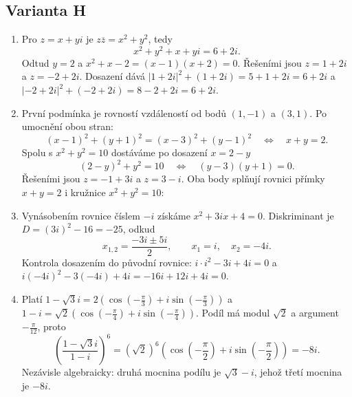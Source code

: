 \documentclass[a4paper,10pt]{article}
\begin{document}
\subsection*{Varianta H}
\begin{enumerate}
\item Pro $z=x+yi$ je $z\overline z=x^2+y^2$, tedy
\[
x^2+y^2+x+yi=6+2i.
\]
Odtud $y=2$ a $x^2+x-2=(x-1)(x+2)=0$.
Řešeními jsou $z=1+2i$ a $z=-2+2i$.
Dosazení dává $|1+2i|^2+(1+2i)=5+1+2i=6+2i$ a
$|-2+2i|^2+(-2+2i)=8-2+2i=6+2i$.

\item První podmínka je rovností vzdáleností od bodů $(1,-1)$
a $(3,1)$. Po umocnění obou stran:
\[
(x-1)^2+(y+1)^2=(x-3)^2+(y-1)^2
\quad\Longleftrightarrow\quad x+y=2.
\]
Spolu s $x^2+y^2=10$ dostáváme po dosazení $x=2-y$
\[
(2-y)^2+y^2=10
\quad\Longleftrightarrow\quad (y-3)(y+1)=0.
\]
Řešeními jsou $z=-1+3i$ a $z=3-i$. Oba body splňují
rovnici přímky $x+y=2$ i kružnice $x^2+y^2=10$:
\begin{center}
\end{center}

\item Vynásobením rovnice číslem $-i$ získáme
$x^2+3ix+4=0$. Diskriminant je $D=(3i)^2-16=-25$,
odkud
\[
x_{1,2}=\frac{-3i\pm5i}{2},
\qquad x_1=i,\quad x_2=-4i.
\]
Kontrola dosazením do původní rovnice:
$i\cdot i^2-3i+4i=0$ a
$i(-4i)^2-3(-4i)+4i=-16i+12i+4i=0$.

\item Platí $1-\sqrt3i=2(\cos(-\frac\pi3)+i\sin(-\frac\pi3))$ a
$1-i=\sqrt2(\cos(-\frac\pi4)+i\sin(-\frac\pi4))$.
Podíl má modul $\sqrt2$ a argument $-\frac\pi{12}$, proto
\[
\left(\frac{1-\sqrt3i}{1-i}\right)^6
=(\sqrt2)^6\left(\cos(-\frac\pi2)+i\sin(-\frac\pi2)\right)=-8i.
\]
Nezávisle algebraicky: druhá mocnina podílu je $\sqrt3-i$,
jehož třetí mocnina je $-8i$.


\end{enumerate}
\end{document}
